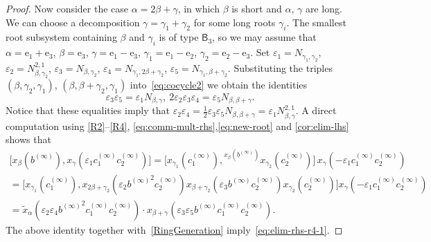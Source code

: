 \documentclass[oneside, 11pt]{amsart}
\numberwithin{equation}{section}
\theoremstyle{definition}
\theoremstyle{remark}
\newcommand{\up}[2]{{^{#1}\!{#2}}}
\newcommand{\rB}{\mathsf{B}}
\begin{document}
\begin{proof}
 Now consider the case \(\alpha = 2\beta + \gamma\), in which \(\beta\) is short and \(\alpha\), \(\gamma\) are long. We can choose a decomposition \(\gamma = \gamma_1 + \gamma_2\) for some long roots \(\gamma_i\). The smallest root subsystem containing \(\beta\) and \(\gamma_i\) is of type \(\rB_3\), so we may assume that \(\alpha = \mathrm e_1 + \mathrm e_3\), \(\beta = \mathrm e_3\), \(\gamma = \mathrm e_1 - \mathrm e_3\), \(\gamma_1 = \mathrm e_1 - \mathrm e_2\), \(\gamma_2 = \mathrm e_2 - \mathrm e_3\). Set $\varepsilon_1 = N_{\gamma_1, \gamma_2}$, $\varepsilon_2 = N_{\beta,\gamma_2}^{2,1}$, $\varepsilon_3 = N_{\beta,\gamma_2}$, $\varepsilon_4 = N_{\gamma_1, 2\beta+\gamma_2}$, $\varepsilon_5 = N_{\gamma_1, \beta+\gamma_2}$.
 Substituting the triples $(\beta, \gamma_2, \gamma_1)$, $(\beta, \beta+\gamma_2, \gamma_1)$ into~\eqref{eq:cocycle2} we obtain the identities 
 \begin{equation*}
  \varepsilon_3 \varepsilon_5 = \varepsilon_1 N_{\beta,\gamma},\ 2\varepsilon_2\varepsilon_3 \varepsilon_4 = \varepsilon_5N_{\beta,\beta+\gamma}.
 \end{equation*}
 Notice that these equalities imply that $\varepsilon_2\varepsilon_4 = \tfrac{1}{2} \varepsilon_3 \varepsilon_5 N_{\beta,\beta+\gamma} = \varepsilon_1 N_{\beta,\gamma}^{2,1}$.
 A direct computation using \eqref{R2}--\eqref{R4}, \eqref{eq:comm-mult-rhs},\eqref{eq:new-root} and \cref{cor:elim-lhs} shows that
 \begin{align*}
  \bigl[x_\beta(b^{(\infty)}), x_\gamma(\varepsilon_1 c_1^{(\infty)} c_2^{(\infty)})\bigr]
   =  \bigl[x_{\gamma_1}(c_1^{(\infty)}), \up{x_\beta(b^{(\infty)})} {x_{\gamma_2}(c_2^{(\infty)})}\bigr]\,
  x_\gamma(-\varepsilon_1 c_1^{(\infty)} c_2^{(\infty)})  \\  
  = \bigl[x_{\gamma_1}(c_1^{(\infty)}), x_{2\beta+\gamma_2}(\varepsilon_2 {b^{(\infty)}}^2 c_2^{(\infty)}) x_{\beta+\gamma_2}(\varepsilon_3 b^{(\infty)} c_2^{(\infty)}) x_{\gamma_2}(c_2^{(\infty)})\bigr] x_\gamma(-\varepsilon_1 c_1^{(\infty)} c_2^{(\infty)}) \\
  = \widetilde{x}_\alpha( \varepsilon_2 \varepsilon_4 {b^{(\infty)}}^2 c_1^{(\infty)}c_2^{(\infty)}) \cdot x_{\beta+\gamma}(\varepsilon_3 \varepsilon_5 b^{(\infty)} c_1^{(\infty)}c_2^{(\infty)}). \end{align*}
The above identity together with~\cref{RingGeneration} imply~\eqref{eq:elim-rhs-r4-1}. \end{proof}
\end{document}
